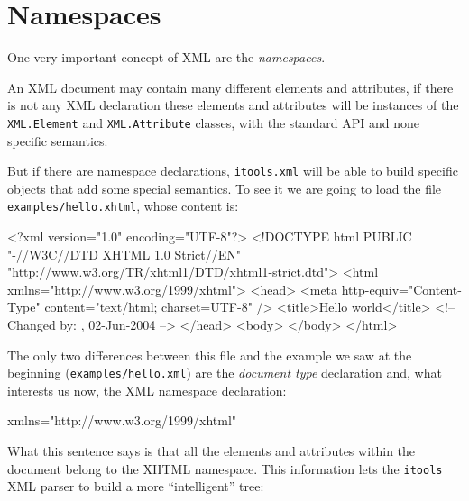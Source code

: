 \section{Namespaces}

One very important concept of XML are the {\em namespaces}.

An XML document may contain many different elements and attributes, if there
is not any XML declaration these elements and attributes will be instances
of the {\tt XML.Element} and {\tt XML.Attribute} classes, with the standard
API and none specific semantics.

But if there are namespace declarations, {\tt itools.xml} will be able to
build specific objects that add some special semantics. To see it we are
going to load the file {\tt examples/hello.xhtml}, whose content is:

\begin{code}
    <?xml version="1.0" encoding="UTF-8"?>
    <!DOCTYPE html PUBLIC "-//W3C//DTD XHTML 1.0 Strict//EN"
           "http://www.w3.org/TR/xhtml1/DTD/xhtml1-strict.dtd">
    <html xmlns="http://www.w3.org/1999/xhtml">
      <head>
        <meta http-equiv="Content-Type" content="text/html; charset=UTF-8" />
        <title>Hello world</title>
        <!-- Changed by: , 02-Jun-2004 -->
      </head>
      <body>
      </body>
    </html>
\end{code}

The only two differences between this file and the example we saw at the
beginning ({\tt examples/hello.xml}) are the {\em document type} declaration
and, what interests us now, the XML namespace declaration:

\begin{code}
    xmlns="http://www.w3.org/1999/xhtml"
\end{code}

What this sentence says is that all the elements and attributes within the
document belong to the XHTML namespace. This information lets the {\tt itools}
XML parser to build a more ``intelligent'' tree:

